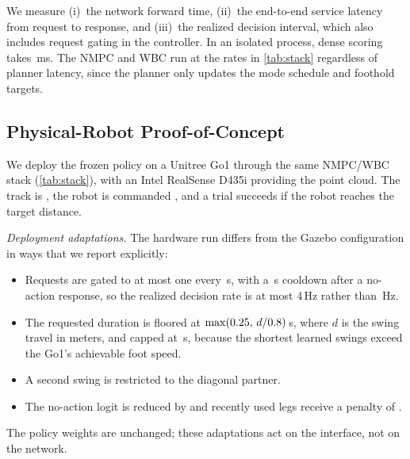 We measure (i)~the network forward time, (ii)~the end-to-end service
latency from request to response, and (iii)~the realized decision
interval, which also includes request gating in the controller. In an
isolated process, dense scoring takes \corlDenseScoreMs\,ms.
 The NMPC and WBC run at the rates in
\autoref{tab:stack} regardless of planner latency, since the planner
only updates the mode schedule and foothold targets.

\subsection{Physical-Robot Proof-of-Concept}
\label{subsec:exp-hardware}

We deploy the frozen policy on a Unitree Go1 through the same NMPC/WBC
stack (\autoref{tab:stack}), with an Intel RealSense D435i providing
the point cloud. The track is , the robot is commanded
, and a trial
succeeds if the robot reaches the target distance.

\textit{Deployment adaptations.} The hardware run differs from the
Gazebo configuration in ways that we report explicitly:
\begin{itemize}
  \item Requests are gated to at most one every
    \corlHwRequestPeriod\,s, with a \corlHwNoopCooldown\,s cooldown after
    a no-action response, so the realized decision rate is at most
    4\,Hz rather than \corlControlHz\,Hz.
  \item The requested duration is floored at
    $\max(0.25,\, d/0.8)$\,s, where
    $d$ is the swing travel in meters, and capped at
    \corlHwMaxSwingDuration\,s, because the shortest learned swings
    exceed the Go1's achievable foot speed.
  \item A second swing is restricted to the diagonal partner.
  \item The no-action logit is reduced by \corlHwNoopLogitPenalty{}
    and recently used legs receive a penalty of
    \corlHwRepeatPenalty{}.
\end{itemize}
The policy weights are unchanged; these adaptations act on the
interface, not on the network.

